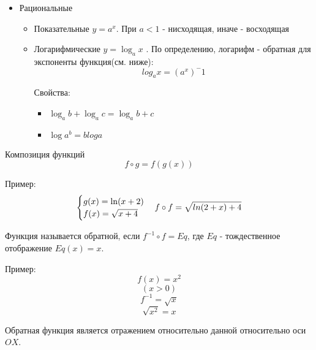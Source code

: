 \documentclass{article}
\begin{document}
\begin{itemize}
\item{Рациональные
\begin{itemize}
\item{Показательные $y = a^x$. При $a<1$ - нисходящая, иначе - восходящая
}
\item{Логарифмические $y = \log_a{x}$ . По определению, логарифм - обратная для экспоненты функция(см. ниже): 
$$
log_a{x}  = (a^x)^-1
$$

Свойства:
\begin{itemize}
\item{$\log_a{b} + \log_a{c} = \log_a{b+c}$}
\item{$\log{a^b} = blog{a}$}
\end{itemize}
}
\end{itemize}
}
\end{itemize}

Композиция функций
$$f \circ g = f(g(x))$$

Пример:
$$
\begin{cases}
g(x) = \ln(x+2)
\\
f(x) = \sqrt{x+4}
\end{cases}
\\
f \circ f = \sqrt{ln(2+x) + 4}
$$

Функция называется обратной, если ${f^{-1}} \circ f = Eq$, где $Eq$ - тождественное отображение $Eq(x) = x$.

Пример: 
$$
f(x) = x^2
$$
$$
(x>0)
$$
$$
f^{-1} = \sqrt{x}
$$
$$
\sqrt{x^2} = x 
$$

Обратная функция является отражением относительно данной относительно оси $OX$. 

\end{document}
